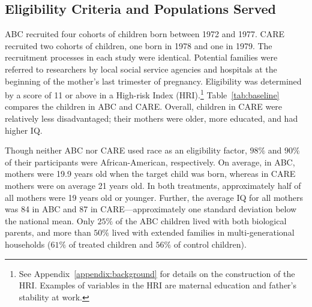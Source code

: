 \subsection{Eligibility Criteria and Populations Served} \label{section:eligibility}

\noindent ABC recruited four cohorts of children born between 1972 and 1977. CARE recruited two cohorts of children, one born in 1978 and one in 1979. The recruitment processes in each study were identical. Potential families were referred to researchers by local social service agencies and hospitals at the beginning of the mother's last trimester of pregnancy. Eligibility was determined by a score of 11 or above in a High-risk Index (HRI).\footnote{See Appendix~\ref{appendix:background} for details on the construction of the HRI. Examples of variables in the HRI are maternal education and father's stability at work.} Table~\ref{tab:baseline} compares the children in ABC and CARE. Overall, children in CARE were relatively less disadvantaged; their mothers were older, more educated, and had higher IQ.



\noindent Though neither ABC nor CARE used race as an eligibility factor, $98\%$ and $90\%$ of their participants were African-American, respectively. On average, in ABC, mothers were 19.9 years old when the target child was born, whereas in CARE mothers were on average 21 years old. In both treatments, approximately half of all mothers were 19 years old or younger. Further, the average IQ for all mothers was 84 in ABC and 87 in CARE---approximately one standard deviation below the national mean. Only $25\%$ of the ABC children lived with both biological parents, and more than $50\%$ lived with extended families in multi-generational households ($61\%$ of treated children and $56\%$ of control children).\\

